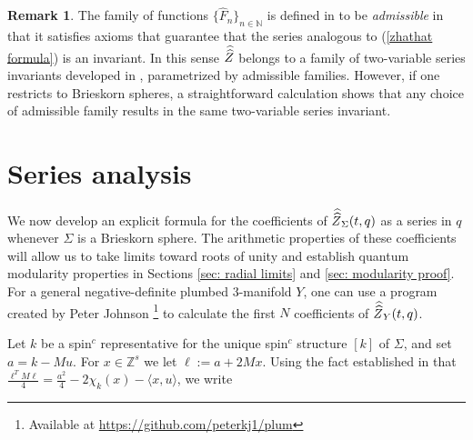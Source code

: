 \documentclass[11pt,letterpaper]{amsart}
\theoremstyle{definition}
\newtheorem*{remark}{Remark}
\theoremstyle{plain}
\newcommand{\Z}{\mathbb{Z}}
\newcommand{\N}{\mathbb{N}}
\newcommand{\Zhathat}{\widehat{\vphantom{\rule{5pt}{10pt}}\smash{\widehat{Z}}\,}\!}
\numberwithin{equation}{section}
\theoremstyle{example}
\begin{document}
\begin{remark} The family of functions $\{\widehat{F}_{n}\}_{n \in \N}$ is defined in \cite{latticecohomology} to be \textit{admissible} in that it satisfies axioms that guarantee that the series analogous to (\ref{zhathat formula}) is an invariant. In this sense $\Zhathat$ belongs to a family of two-variable series invariants developed in \cite{latticecohomology}, parametrized by admissible families. However, if one restricts to Brieskorn spheres, a straightforward calculation shows that any choice of admissible family results in the same two-variable series invariant.
\end{remark}

\section{Series analysis} \label{sec: series analysis}

We now develop an explicit formula for the coefficients of $\Zhathat_{\Sigma}(t,q)$ as a series in $q$ whenever $\Sigma$ is a Brieskorn sphere. The arithmetic properties of these coefficients will allow us to take limits toward roots of unity and establish quantum modularity properties in Sections \ref{sec: radial limits} and \ref{sec: modularity proof}. For a general negative-definite plumbed $3$-manifold $Y$, one can use a program created by Peter Johnson \footnote{Available at \href{https://github.com/peterkj1/plum}{https://github.com/peterkj1/plum}} to calculate the first $N$ coefficients of $\Zhathat_{Y}(t,q)$.

Let $k$ be a spin$^c$ representative for the unique spin$^c$ structure $[k]$ of $\Sigma$, and set $a = k-Mu$. For $x \in \Z^{s}$ we let $\ell:=a+2Mx$. Using the fact established in \cite{latticecohomology} that $\frac{\ell^{T}M\ell}{4}=\frac{a^{2}}{4}-2\chi_{k}(x)-\langle x, u \rangle$, we write
\end{document}
